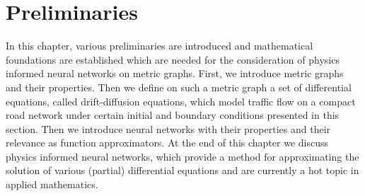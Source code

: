 \chapter{Preliminaries}


In this chapter, various preliminaries are introduced and mathematical foundations are established which are needed for the consideration of physics informed neural networks on metric graphs. First, we introduce metric graphs and their properties. Then we define on such a metric graph a set of differential equations, called drift-diffusion equations, which model traffic flow on a compact road network under certain initial and boundary conditions presented in this section. Then we introduce neural networks with their properties and their relevance as function approximators. At the end of this chapter we discuss physics informed neural networks, which provide a method for approximating the solution of various (partial) differential equations and are currently a hot topic in applied mathematics. 




